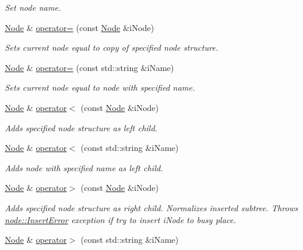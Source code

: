 \begin{DoxyCompactItemize}
\begin{DoxyCompactList}\small\item\em Set node name. \end{DoxyCompactList}\item 
\hyperlink{classnode_1_1Node}{Node} \& \hyperlink{classnode_1_1Node_af6e99944cbf63f15cd85ecb4655bde6e}{operator=} (const \hyperlink{classnode_1_1Node}{Node} \&i\-Node)
\begin{DoxyCompactList}\small\item\em Sets current node equal to {\itshape copy} of specified node structure. \end{DoxyCompactList}\item 
\hyperlink{classnode_1_1Node}{Node} \& \hyperlink{classnode_1_1Node_a75716ea94259082ba459234bdf45be50}{operator=} (const std\-::string \&i\-Name)
\begin{DoxyCompactList}\small\item\em Sets current node equal to node with specified name. \end{DoxyCompactList}\item 
\hyperlink{classnode_1_1Node}{Node} \& \hyperlink{classnode_1_1Node_aedae3083215e9f9785d3d9d655a26fc7}{operator$<$} (const \hyperlink{classnode_1_1Node}{Node} \&i\-Node)
\begin{DoxyCompactList}\small\item\em Adds specified node structure as left child. \end{DoxyCompactList}\item 
\hyperlink{classnode_1_1Node}{Node} \& \hyperlink{classnode_1_1Node_ad9bf2bb992fb6c363fb2cdf6d5fd7924}{operator$<$} (const std\-::string \&i\-Name)
\begin{DoxyCompactList}\small\item\em Adds node with specified name as left child. \end{DoxyCompactList}\item 
\hyperlink{classnode_1_1Node}{Node} \& \hyperlink{classnode_1_1Node_a74195c5033e17798b6ad909765012317}{operator$>$} (const \hyperlink{classnode_1_1Node}{Node} \&i\-Node)
\begin{DoxyCompactList}\small\item\em Adds specified node structure as right child. Normalizes inserted subtree. Throws \hyperlink{classnode_1_1InsertError}{node\-::\-Insert\-Error} exception if try to insert i\-Node to busy place. \end{DoxyCompactList}\item 
\hyperlink{classnode_1_1Node}{Node} \& \hyperlink{classnode_1_1Node_a92db84e7ddf68b555800f72621745311}{operator$>$} (const std\-::string \&i\-Name)

\end{DoxyCompactItemize}
